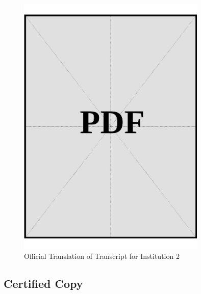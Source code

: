 \begin{figure}[h]
    \centering
    \includegraphics[page=1, width=0.8\textwidth]{../docs/applicant/post-secondary-institutions/institution-2/transcript/official-translations.pdf}
    \caption{Official Translation of Transcript for Institution 2}
    \label{fig:institution-2-transcript-official-translation}
\end{figure}

\vspace*{\fill}
\clearpage

\subsection*{Certified Copy}

\vspace*{\fill}

